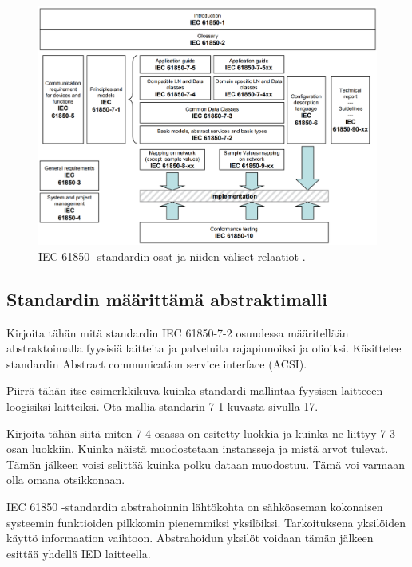 \begin{figure}
	\includegraphics[width=1\textwidth]{pictures/iec-61850-series-and-relations.png}
	\caption{IEC 61850 -standardin osat ja niiden väliset relaatiot \cite[s.~14]{IEC61850-7-1}.}
	\label{fig:iec61850-osat-ja-relaatiot}
\end{figure}

\subsection{Standardin määrittämä abstraktimalli}
\begin{it}
	Kirjoita tähän mitä standardin IEC 61850-7-2 osuudessa määritellään abstraktoimalla fyysisiä laitteita ja palveluita rajapinnoiksi ja olioiksi. Käsittelee standardin Abstract communication service interface (ACSI).

	Piirrä tähän itse esimerkkikuva kuinka standardi mallintaa fyysisen laitteeen loogisiksi laitteiksi. Ota mallia standarin 7-1 kuvasta sivulla 17.

	Kirjoita tähän siitä miten 7-4 osassa on esitetty luokkia ja kuinka ne liittyy 7-3 osan luokkiin. Kuinka näistä muodostetaan instansseja ja mistä arvot tulevat. Tämän jälkeen voisi selittää kuinka polku dataan muodostuu. Tämä voi varmaan olla omana otsikkonaan.
\end{it}

IEC 61850 -standardin abstrahoinnin lähtökohta on sähköaseman kokonaisen systeemin funktioiden pilkkomin pienemmiksi yksilöiksi. Tarkoituksena yksilöiden käyttö informaation vaihtoon. Abstrahoidun yksilöt voidaan tämän jälkeen esittää yhdellä IED laitteella.

